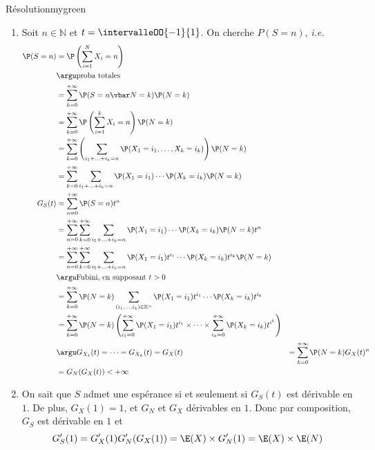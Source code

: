     \begin{demo}{Résolution}{mygreen}
        \begin{enumerate}[label = (\alph*)]
            \item Soit $n \in \mathbb{N}$ et $t = \intervalleOO{-1}{1}$. On cherche $P (S = n)$, \textit{i.e.} 
            \begin{align*}
                \P(S = n) 
                &= \P\left(\sum_{i=1}^{N} X_i = n\right) \\
                &\argu \text{proba totales} \\
                &= \sum_{k=0}^{+\infty} \P(S = n \vbar N = k) \P(N = k) \\
                &= \sum_{k=0}^{+\infty} \P\left(\sum_{i=1}^{k} X_i = n\right) \P(N=k) \\
                &= \sum_{k=0}^{+\infty} \left(\sum_{i_1 + \ldots + i_k = n} \P(X_1 = i_1,\ldots,X_k = i_k)\right) \P(N = k) \\
                &= \sum_{k=0}^{+\infty} \sum_{i_1 + \ldots + i_k = n} \P(X_1 = i_1) \cdots \P(X_k = i_k) \P(N = k) \\
                G_S(t) 
                &= \sum_{n=0}^{+\infty} \P(S = n) t^n \\
                &= \sum_{n=0}^{+\infty} \sum_{k=0}^{+\infty} \sum_{i_1 + \ldots + i_k = n} \P(X_1 = i_1) \cdots \P(X_k = i_k) \P(N = k) t^n \\
                &= \sum_{n=0}^{+\infty} \sum_{k=0}^{+\infty} \sum_{i_1 + \ldots + i_k = n} \P(X_1 = i_1)t^{i_1} \cdots \P(X_k = i_k) t^{i_k} \P(N = k) \\
                &\argu \text{Fubini, en supposant } t > 0 \\
                &= \sum_{k=0}^{+\infty} \P(N = k) \sum_{(i_1,\ldots,i_k) \in \mathbb{K}^n} \P(X_1 = i_1)t^{i_1} \cdots \P(X_k = i_k) t^{i_k} \\ 
                &= \sum_{k=0}^{+\infty} \P(N = k) \left(\sum_{i_1 = 0}^{+\infty} \P(X_1 = i_1) t^{i_1} \times \cdots \times \sum_{i_k = 0}^{+\infty} \P(X_k = i_k) t^{i^k}\right) \\
                &\argu G_{X_1}(t) = \cdots = G_{X_k}(t) = G_X(t)
                &= \sum_{k=0}^{+\infty} \P(N = k) G_X(t)^n \\
                &= G_N(G_X(t)) < +\infty 
            \end{align*}
            \item On sait que $S$ admet une espérance si et seulement si $G_S(t)$ est dérivable en $1$. De plus, $G_X(1) = 1$, et $G_N$ et $G_X$ dérivables en $1$. Donc par composition, $G_S$ est dérivable en $1$ et 
            \[ G_S'(1) = G_X'(1) G_N'(G_X(1)) = \E(X) \times G_N'(1) = \E(X) \times \E(N) \]   
        \end{enumerate}
    \end{demo}

